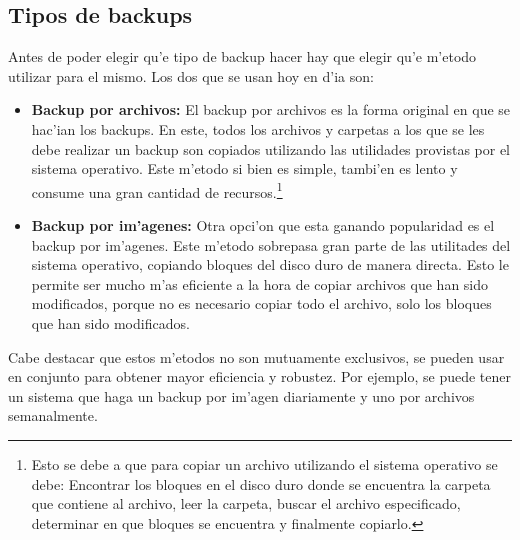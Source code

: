 \documentclass[11pt]{article}
\newcommand{\customitem}[1]{\item \textbf{#1:}}
\begin{document}
	 \subsection{Tipos de backups}
		Antes de poder elegir qu'e tipo de backup hacer hay que elegir qu'e m'etodo utilizar para el mismo. Los dos que se usan hoy en d'ia son:
		\begin{itemize}
			\customitem{Backup por archivos} El backup por archivos es la forma original en que se hac'ian los backups. En este, todos los archivos y carpetas a los que se les debe realizar un backup son copiados utilizando las utilidades provistas por el sistema operativo. Este m'etodo si bien es simple, tambi'en es lento y consume una gran cantidad de recursos.\footnote{Esto se debe a que para copiar un archivo utilizando el sistema operativo se debe: Encontrar los bloques en el disco duro donde se encuentra la carpeta que contiene al archivo, leer la carpeta, buscar el archivo especificado, determinar en que bloques se encuentra y finalmente copiarlo.}
			\customitem{Backup por im'agenes} Otra opci'on que esta ganando popularidad es el backup por im'agenes. Este m'etodo sobrepasa gran parte de las utilitades del sistema operativo, copiando bloques del disco duro de manera directa. Esto le permite ser mucho m'as eficiente a la hora de copiar archivos que han sido modificados, porque no es necesario copiar todo el archivo, solo los bloques que han sido modificados. 
		\end{itemize}

		Cabe destacar que estos m'etodos no son mutuamente exclusivos, se pueden usar en conjunto para obtener mayor eficiencia y robustez. Por ejemplo, se puede tener un sistema que haga un backup por im'agen diariamente y uno por archivos semanalmente.
\end{document}

